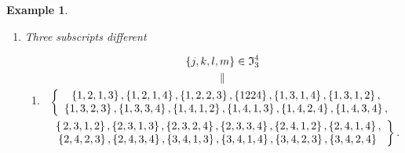 \documentclass[aps,preprint]{revtex4}%
\newtheorem{example}[theorem]{Example}
\begin{document}
\begin{example}
\begin{enumerate}
\begin{enumerate}
\item Permutations $\sigma\in S_{2}$ inducing permutations $\mu_{\sigma}\in
S_{4}$
\begin{align}
\mu_{\sigma}\left(  \left\{  j,k,j+r,k+4\right\}  \right)   &  =\left\{
\sigma\left(  j\right)  ,\sigma\left(  k\right)  ,\sigma\left(  j\right)
+4,\sigma\left(  k\right)  +4\right\} \\
\left\{  j,k\right\}   &  \in\mathcal{P}_{2}\left(  \left\{  1,2,3,4\right\}
\right)
\end{align}
e.g.%
\begin{equation}
O_{\sigma\left(  1\right)  \sigma\left(  2\right)  \sigma\left(  1\right)
\sigma\left(  2\right)  }\,a_{\sigma\left(  1\right)  }^{\dagger}%
a_{\sigma\left(  2\right)  }^{\dagger}a_{\sigma\left(  1\right)  }%
a_{\sigma\left(  2\right)  }=\frac{1}{2^{4}}O_{\sigma\left(  1\right)
\sigma\left(  2\right)  \sigma\left(  1\right)  \sigma\left(  2\right)
}\left(  \overset{}{x_{\sigma\left(  1\right)  }-ix_{\sigma\left(  1\right)
+4}}\right)  \left(  \overset{}{x_{\sigma\left(  2\right)  }-ix_{\sigma\left(
2\right)  +4}}\right)  \left(  \overset{}{x_{\sigma\left(  1\right)
}+ix_{\sigma\left(  1\right)  +4}}\right)  \left(  \overset{}{x_{\sigma\left(
2\right)  }+ix_{\sigma\left(  2\right)  +4}}\right)  .
\end{equation}
$\qquad\qquad\qquad$
\end{enumerate}

\item Three subscripts different \label{04/26}

\begin{enumerate}
\item
\begin{gather}
\left\{  j,k,l,m\right\}  \in\mathfrak{I}_{3}^{4}\\
\parallel\\
\left\{
\begin{array}
[c]{c}%
\left\{  1,2,1,3\right\}  ,\left\{  1,2,1,4\right\}  ,\left\{
1,2,2,3\right\}  ,\left\{  1224\right\}  ,\left\{  1,3,1,4\right\}  ,\left\{
1,3,1,2\right\}  ,\\
\left\{  1,3,2,3\right\}  ,\left\{  1,3,3,4\right\}  ,\left\{
1,4,1,2\right\}  ,\left\{  1,4,1,3\right\}  ,\left\{  1,4,2,4\right\}
,\left\{  1,4,3,4\right\}  ,
\end{array}
\right. \\
\,\left.
\begin{array}
[c]{c}%
\,\left\{  \,2,3,1,2\right\}  ,\left\{  2,3,1,3\right\}  ,\left\{
2,3,2,4\right\}  ,\left\{  2,3,3,4\right\}  ,\left\{  2,4,1,2\right\}
,\left\{  2,4,1,4\right\}  ,\\
\left\{  2,4,2,3\right\}  ,\left\{  2,4,3,4\right\}  ,\left\{
3,4,1,3\right\}  ,\left\{  3,4,1,4\right\}  ,\left\{  3,4,2,3\right\}
,\left\{  3,4,2,4\right\}
\end{array}
\right\}  .
\end{gather}



\end{enumerate}
\end{enumerate}
\end{example}
\end{document}
